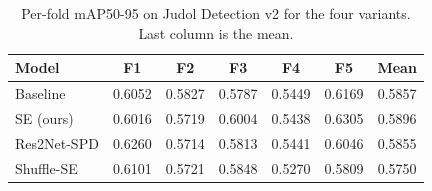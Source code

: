 \begin{table}[t]
\caption{Per-fold mAP50-95 on Judol Detection v2 for the four variants. Last column is the mean.}
\label{tab:perfold}
\centering\footnotesize\renewcommand{\arraystretch}{1.3}
\setlength{\tabcolsep}{5pt}
\begin{tabular}{@{}lcccccc@{}}
\toprule
\textbf{Model} & \textbf{F1} & \textbf{F2} & \textbf{F3} & \textbf{F4} & \textbf{F5} & \textbf{Mean} \\
\midrule
Baseline & 0.6052 & 0.5827 & 0.5787 & 0.5449 & 0.6169 & 0.5857 \\
SE (ours) & 0.6016 & 0.5719 & 0.6004 & 0.5438 & 0.6305 & 0.5896 \\
Res2Net-SPD & 0.6260 & 0.5714 & 0.5813 & 0.5441 & 0.6046 & 0.5855 \\
Shuffle-SE & 0.6101 & 0.5721 & 0.5848 & 0.5270 & 0.5809 & 0.5750 \\
\bottomrule
\end{tabular}
\end{table}
